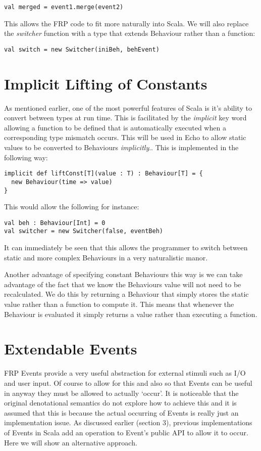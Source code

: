 \begin{verbatim}
val merged = event1.merge(event2)
\end{verbatim}

  This allows the FRP code to fit more naturally into Scala. We will also replace the \emph{switcher} function
  with a type that extends Behaviour rather than a function:
  
\begin{verbatim}
val switch = new Switcher(iniBeh, behEvent)
\end{verbatim}

  \section{Implicit Lifting of Constants}
    As mentioned earlier, one of the most powerful features of Scala is it's ability to convert between
    types at run time. This is facilitated by the \emph{implicit} key word allowing a function to be defined
    that is automatically executed when a corresponding type mismatch occurs. This will be used in Echo to allow 
    static values to be converted to Behaviours \emph{implicitly}.. This is implemented in the following way:  

\begin{verbatim}
implicit def liftConst[T](value : T) : Behaviour[T] = {
  new Behaviour(time => value)
}
\end{verbatim}              
    
    This would allow the following for instance:

\begin{verbatim}
val beh : Behaviour[Int] = 0
val switcher = new Switcher(false, eventBeh)
\end{verbatim}       

    It can immediately be seen that this allows the programmer to switch between static and more complex
    Behaviours in a very naturalistic manor.
    
    Another advantage of specifying constant Behaviours this way is we can take advantage of the fact that
    we know the Behaviours value will not need to be recalculated. We do this by returning a Behaviour
    that simply stores the static value rather than a function to compute it. This means that whenever the Behaviour
    is evaluated it simply returns a value rather than executing a function.
    
  \section{Extendable Events}
    FRP Events provide a very useful abstraction for external stimuli such as I/O and user input. Of course
    to allow for this and also so that Events can be useful in anyway they must be allowed to actually `occur'.
    It is noticeable that the original denotational semantics \cite{Elliott1997} do not explore how to achieve
    this and it is assumed that this is because the actual occurring of Events is really just an implementation
    issue. As discussed earlier (section 3), previous implementations of Events in Scala add an operation to Event's
    public API to allow it to occur. Here we will show an alternative approach.
    

